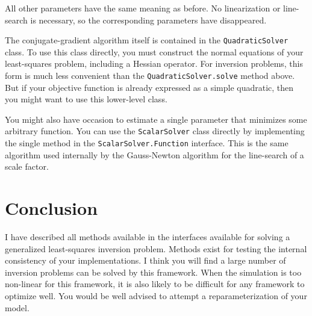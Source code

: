 \documentclass[12pt]{article}
\begin{document}
All other parameters have the same meaning as
before.  No linearization or line-search is
necessary, so the corresponding parameters
have disappeared.

The conjugate-gradient algorithm itself is
contained in the
\texttt{Quad\-ra\-tic\-Sol\-ver} class.  To
use this class directly, you must construct
the normal equations of your least-squares
problem, including a Hessian operator.  For
inversion problems, this form is much less
convenient than the
\texttt{Quadratic\-Solver.solve} method
above.  But if your objective function is
already expressed as a simple quadratic, then
you might want to use this lower-level class.

You might also have occasion to estimate a
single parameter that minimizes some
arbitrary function.  You can use the
\texttt{ScalarSolver} class directly by
implementing the single method in the
\texttt{ScalarSolver.Function} interface.
This is the same algorithm used internally by
the Gauss-Newton algorithm for the
line-search of a scale factor.

\section {Conclusion}

I have described all methods available in the
interfaces available for solving a
generalized least-squares inversion problem.
Methods exist for testing the internal
consistency of your implementations.  I think
you will find a large number of inversion
problems can be solved by this framework.
When the simulation is too non-linear for
this framework, it is also likely to be
difficult for any framework to optimize well.
You would be well advised to attempt a
reparameterization of your model.


\end{document}
